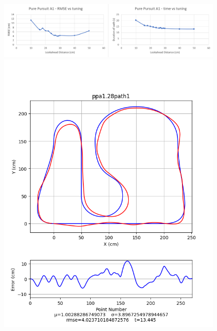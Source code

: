 \documentclass[12pt]{article}
\begin{document}
\begin{flushleft}
\begin{figure}[H]
\includegraphics[width=\linewidth]{images/tuningGraphs/ppa1}
\includegraphics[width=\linewidth]{images/pathData/ppa1path1}
\endminipage\hfill
{}

\end{figure}
\end{flushleft}
\end{document}
